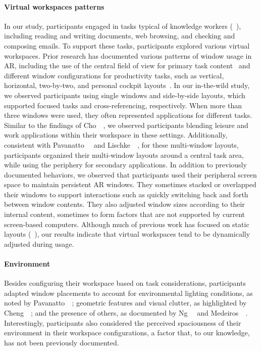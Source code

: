 \paragraph{Virtual workspaces patterns}
In our study, participants engaged in tasks typical of knowledge workers (\eg~\cite{hernandez2024software}), including reading and writing documents, web browsing, and checking and composing emails. 
To support these tasks, participants explored various virtual workspaces.
% 
Prior research has documented various patterns of window usage in AR, including the use of the central field of view for primary task content~\cite{pavanatto2024xrwild,lischke2016screenarrangement} and different window configurations for productivity tasks, such as vertical, horizontal, two-by-two, and personal cockpit layouts~\cite{mcgill2020seatedvrworkspace,ens2014personalcockpit}.
In our in-the-wild study, we observed participants using single windows and side-by-side layouts, which supported focused tasks and cross-referencing, respectively.
When more than three windows were used, 
they often represented applications for different tasks. 
% 
Similar to the findings of Cho~\etal~\cite{cho2024minexr}, we observed participants blending leisure and work applications within their workspace in these settings. 
Additionally, consistent with Pavanatto~\etal~\cite{pavanatto2024xrwild} and Lischke~\etal~\cite{lischke2016screenarrangement}, 
for these multi-window layouts, 
participants organized their multi-window layouts around a central task area, while using the periphery for secondary applications.
In addition to previously documented behaviors, we observed that participants used their peripheral screen space to maintain persistent AR windows. 
They sometimes stacked or overlapped their windows to support interactions such as quickly switching back and forth between window contents. 
They also adjusted window sizes according to their internal content, sometimes to form factors that are not supported by current screen-based computers.
Although much of previous work has focused on static layouts (\eg~\cite{cheng2021semanticadapt,biener2022vrweek}), 
our results indicate that virtual workspaces tend to be dynamically adjusted during usage. 

\paragraph{Environment}
Besides configuring their workspace based on task considerations, participants adapted window placements to account for environmental lighting conditions, 
as noted by Pavanatto~\etal~\cite{pavanatto2024xrwild}; 
geometric features and visual clutter, as highlighted by Cheng~\etal~\cite{cheng2021semanticadapt}; 
and the presence of others, as documented by Ng~\etal~\cite{ng2021passengerexperiencemrairplane} and Medeiros~\etal~\cite{medeiros2022shieldingar}. 
Interestingly, participants also considered the perceived spaciousness of their environment in their workspace configurations, a factor that, to our knowledge, has not been previously documented. 

